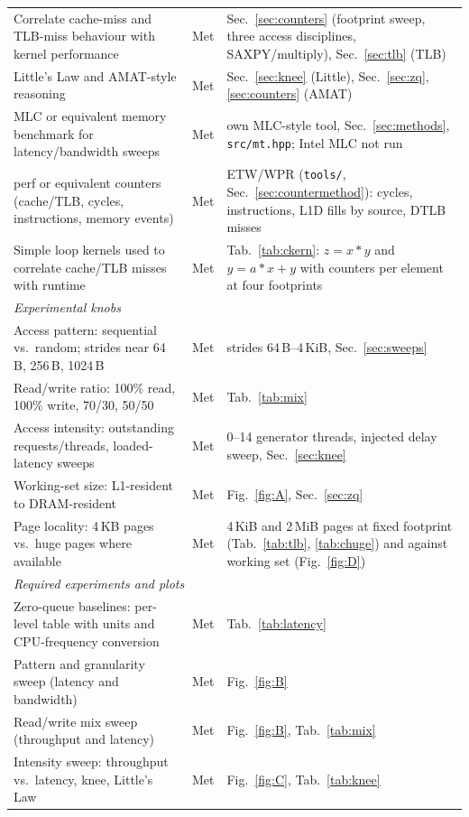 \documentclass{article}
\begin{document}
{\begin{longtable}{p{6.0cm}p{1.6cm}p{8.0cm}}
Correlate cache-miss and TLB-miss behaviour with kernel performance & Met & Sec.~\ref{sec:counters} (footprint sweep, three access disciplines, SAXPY/multiply), Sec.~\ref{sec:tlb} (TLB) \\
Little's Law and AMAT-style reasoning & Met & Sec.~\ref{sec:knee} (Little), Sec.~\ref{sec:zq}, \ref{sec:counters} (AMAT) \\
MLC or equivalent memory benchmark for latency/bandwidth sweeps & Met & own MLC-style tool, Sec.~\ref{sec:methods}, \texttt{src/mt.hpp}; Intel MLC \cite{intelmlc} not run \\
perf or equivalent counters (cache/TLB, cycles, instructions, memory events) & Met & ETW/WPR (\texttt{tools/}, Sec.~\ref{sec:countermethod}): cycles, instructions, L1D fills by source, DTLB misses \\
Simple loop kernels used to correlate cache/TLB misses with runtime & Met & Tab.~\ref{tab:ckern}: $z=x*y$ and $y=a*x+y$ with counters per element at four footprints \\
\midrule
\multicolumn{3}{l}{\textit{Experimental knobs}} \\
Access pattern: sequential vs.\ random; strides near 64\,B, 256\,B, 1024\,B & Met & strides 64\,B--4\,KiB, Sec.~\ref{sec:sweeps} \\
Read/write ratio: 100\% read, 100\% write, 70/30, 50/50 & Met & Tab.~\ref{tab:mix} \\
Access intensity: outstanding requests/threads, loaded-latency sweeps & Met & 0--14 generator threads, injected delay sweep, Sec.~\ref{sec:knee} \\
Working-set size: L1-resident to DRAM-resident & Met & Fig.~\ref{fig:A}, Sec.~\ref{sec:zq} \\
Page locality: 4\,KB pages vs.\ huge pages where available & Met & 4\,KiB and 2\,MiB pages at fixed footprint (Tab.~\ref{tab:tlb}, \ref{tab:chuge}) and against working set (Fig.~\ref{fig:D}) \\
\midrule
\multicolumn{3}{l}{\textit{Required experiments and plots}} \\
Zero-queue baselines: per-level table with units and CPU-frequency conversion & Met & Tab.~\ref{tab:latency} \\
Pattern and granularity sweep (latency and bandwidth) & Met & Fig.~\ref{fig:B} \\
Read/write mix sweep (throughput and latency) & Met & Fig.~\ref{fig:B}, Tab.~\ref{tab:mix} \\
Intensity sweep: throughput vs.\ latency, knee, Little's Law & Met & Fig.~\ref{fig:C}, Tab.~\ref{tab:knee} \\

\end{longtable}}
\end{document}
